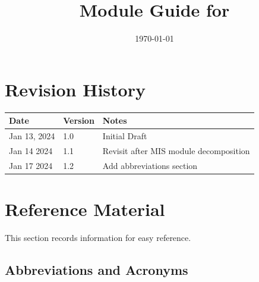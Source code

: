 \documentclass[12pt, titlepage]{article}
\begin{document}
\title{Module Guide for \progname{}} 
\author{\authname}
\date{\today}

\maketitle


\section{Revision History}

\begin{tabularx}{\textwidth}{p{3cm}p{2cm}X}
\toprule {\bf Date} & {\bf Version} & {\bf Notes}\\
\midrule
Jan 13, 2024 & 1.0 & Initial Draft\\
Jan 14 2024 & 1.1 & Revisit after MIS module decomposition\\
Jan 17 2024 & 1.2 & Add abbreviations section\\
\bottomrule
\end{tabularx}

\newpage

\section{Reference Material}

This section records information for easy reference.

\subsection{Abbreviations and Acronyms}
\end{document}
